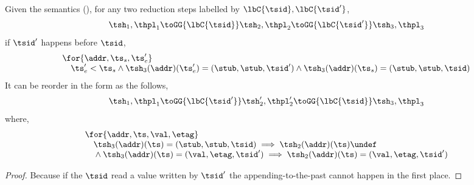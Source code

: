 \begin{lem}
\label{lem:reorder-the-future-and-past}
Given the semantics (), for any two reduction steps labelled by \( \lbC{\tsid}, \lbC{\tsid'} \),
\[
    \tsh_{1}, \thpl_{1} \toGG{\lbC{\tsid}} \tsh_{2}, \thpl_{2} \toGG{\lbC{\tsid'}} \tsh_{3}, \thpl_{3}
\]
if \( \tsid' \) happens before \( \tsid \), 
\[
\begin{array}{@{}l@{}}
    \for{\addr, \ts_{s}, \ts_{e}'} \\
    \quad \ts_{e}' < \ts_{s}
    \land \tsh_{3}(\addr)(\ts_{e}') = (\stub, \stub, \tsid')
    \land \tsh_{3}(\addr)(\ts_{s}) = (\stub, \stub, \tsid)
\end{array}
\]
It can be reorder in the form as the follows,
\[
\begin{array}{@{}l@{}}
    \tsh_{1}, \thpl_{1} \toGG{\lbC{\tsid'}} \tsh_{2}', \thpl_{2}' \toGG{\lbC{\tsid}} \tsh_{3}, \thpl_{3}
\end{array}
\]
where,
\[
\begin{array}{@{}l@{}}
    \for{\addr, \ts,\val,\etag} \\
    \quad \tsh_{3}(\addr)(\ts) = (\stub, \stub, \tsid) \implies \tsh_{2}(\addr)(\ts) \undef \\ 
    \quad {} \land \tsh_{3}(\addr)(\ts) = (\val, \etag, \tsid') \implies \tsh_{2}(\addr)(\ts) = (\val, \etag, \tsid')
\end{array}
\]
\end{lem}
\begin{proof}
Because if the \( \tsid \) read a value written by \( \tsid' \) the appending-to-the-past cannot happen in the first place.
\end{proof}

